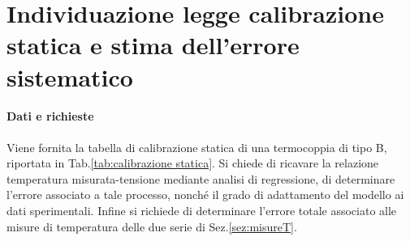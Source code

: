 \section{Individuazione legge calibrazione statica e stima dell'errore sistematico} \label{sec:legge}

\paragraph{Dati e richieste}
Viene fornita la tabella di calibrazione statica di una termocoppia di tipo B, riportata in Tab.\ref{tab:calibrazione statica}. Si chiede di ricavare la relazione temperatura misurata-tensione mediante analisi di regressione, di determinare l'errore associato a tale processo, nonché il grado di adattamento del modello ai dati sperimentali. Infine si richiede di determinare l'errore totale associato alle misure di temperatura delle due serie di Sez.\ref{sez:misureT}.

